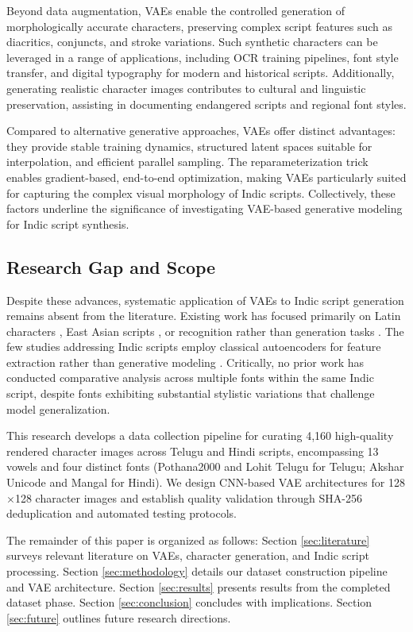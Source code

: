 \documentclass[review]{elsarticle}
\begin{document}
Beyond data augmentation, VAEs enable the controlled generation of morphologically accurate characters, preserving complex script features such as diacritics, conjuncts, and stroke variations. Such synthetic characters can be leveraged in a range of applications, including OCR training pipelines, font style transfer, and digital typography for modern and historical scripts. Additionally, generating realistic character images contributes to cultural and linguistic preservation, assisting in documenting endangered scripts and regional font styles.

Compared to alternative generative approaches, VAEs offer distinct advantages: they provide stable training dynamics, structured latent spaces suitable for interpolation, and efficient parallel sampling. The reparameterization trick \cite{kingma2013} enables gradient-based, end-to-end optimization, making VAEs particularly suited for capturing the complex visual morphology of Indic scripts. Collectively, these factors underline the significance of investigating VAE-based generative modeling for Indic script synthesis.

\subsection{Research Gap and Scope}

Despite these advances, systematic application of VAEs to Indic script generation remains absent from the literature. Existing work has focused primarily on Latin characters \cite{fukui2022}, East Asian scripts \cite{liu2019}, or recognition rather than generation tasks \cite{malakar2024}. The few studies addressing Indic scripts employ classical autoencoders for feature extraction rather than generative modeling \cite{seshadri2012}. Critically, no prior work has conducted comparative analysis across multiple fonts within the same Indic script, despite fonts exhibiting substantial stylistic variations that challenge model generalization.

This research develops a data collection pipeline for curating 4,160 high-quality rendered character images across Telugu and Hindi scripts, encompassing 13 vowels and four distinct fonts (Pothana2000 and Lohit Telugu for Telugu; Akshar Unicode and Mangal for Hindi). We design CNN-based VAE architectures for 128$\times$128 character images and establish quality validation through SHA-256 deduplication and automated testing protocols.

The remainder of this paper is organized as follows: Section \ref{sec:literature} surveys relevant literature on VAEs, character generation, and Indic script processing. Section \ref{sec:methodology} details our dataset construction pipeline and VAE architecture. Section \ref{sec:results} presents results from the completed dataset phase. Section \ref{sec:conclusion} concludes with implications. Section \ref{sec:future} outlines future research directions.
\end{document}
